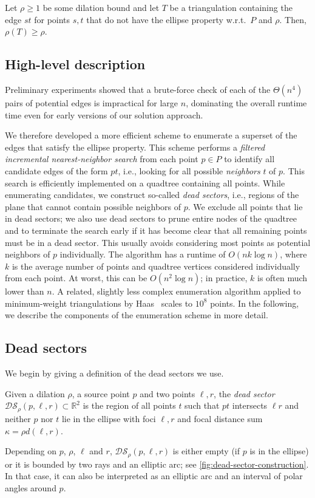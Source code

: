 \begin{observation}
  Let $\rho \geq 1$ be some dilation bound and let $T$ be a triangulation containing the edge $st$
  for points $s,t$ that do not have the ellipse property w.r.t.\ $P$ and $\rho$.
  Then, $\rho(T) \geq \rho$.
\end{observation}

\subsection{High-level description}
\label{sec:ellipse-filter-algo}
Preliminary experiments showed that a brute-force check of each of the $\Theta(n^4)$ pairs of
potential edges is impractical for large $n$, dominating the overall runtime time even for
early versions of our solution approach.

We therefore developed a more efficient scheme to enumerate a superset of the edges that satisfy the ellipse property.
This scheme performs a \emph{filtered incremental nearest-neighbor search} from each point $p \in P$
to identify all candidate edges of the form $pt$, i.e., looking for all possible \emph{neighbors} $t$ of $p$.
This search is efficiently implemented on a quadtree containing all points.
While enumerating candidates, we construct so-called \emph{dead sectors}, i.e., regions of the plane that
cannot contain possible neighbors of $p$.
We exclude all points that lie in dead sectors; we also use dead sectors to prune entire nodes of the quadtree
and to terminate the search early if it has become clear that all remaining points must be in a dead sector.
This usually avoids considering most points as potential neighbors of $p$ individually.
The algorithm has a runtime of $O(nk\log n)$, where $k$ is the average number of points and quadtree vertices considered individually from each point.
At worst, this can be $O(n^2\log n)$; in practice, $k$ is often much lower than $n$.
A related, slightly less complex enumeration algorithm applied to minimum-weight triangulations by Haas~\cite{haasmwt} scales to $10^8$ points.
In the following, we describe the components of the enumeration scheme in more detail.

\subsection{Dead sectors}
\label{sec:dead-sectors}
We begin by giving a definition of the dead sectors we use.
\begin{definition}
  Given a dilation $\rho$, a source point $p$ and two points $\ell, r$,
  the \emph{dead sector} $\mathcal{DS}_{\rho}(p, \ell, r) \subset \mathbb{R}^2$ is the region of all points $t$ such that 
  $pt$ intersects $\ell r$ and neither $p$ nor $t$ lie in the ellipse with foci $\ell, r$ and focal distance sum 
  $\kappa = \rho d(\ell, r)$.
\end{definition}
Depending on $p$, $\rho$, $\ell$ and $r$, $\mathcal{DS}_{\rho}(p, \ell, r)$ is either empty (if $p$ is in the ellipse)
or it is bounded by two rays and an elliptic arc; see \cref{fig:dead-sector-construction}.
In that case, it can also be interpreted as an elliptic arc and an interval of polar angles around $p$.

